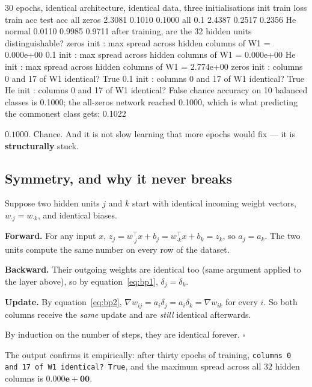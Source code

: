 \documentclass[11pt]{article}
\begin{document}
\begin{codeout}
30 epochs, identical architecture, identical data, three initialisations
  init            train loss  train acc  test acc
  all zeros         2.3081      0.1010     0.1000
  all 0.1           2.4387      0.2517     0.2356
  He normal         0.0110      0.9985     0.9711
after training, are the 32 hidden units distinguishable?
  zeros init : max spread across hidden columns of W1 = 0.000e+00
  0.1   init : max spread across hidden columns of W1 = 0.000e+00
  He    init : max spread across hidden columns of W1 = 2.774e+00
  zeros init : columns 0 and 17 of W1 identical? True
  0.1   init : columns 0 and 17 of W1 identical? True
  He    init : columns 0 and 17 of W1 identical? False
chance accuracy on 10 balanced classes is 0.1000;
  the all-zeros network reached 0.1000, which is what predicting the
  commonest class gets: 0.1022
\end{codeout}

$\mathbf{0.1000}$. Chance. And it is not slow learning that more epochs would
fix --- it is \textbf{structurally} stuck.

\subsection{Symmetry, and why it never breaks}

\begin{worked}
Suppose two hidden units $j$ and $k$ start with identical incoming weight
vectors, $w_{\cdot j} = w_{\cdot k}$, and identical biases.

\textbf{Forward.} For any input $x$, $z_j = w_{\cdot j}^\top x + b_j =
w_{\cdot k}^\top x + b_k = z_k$, so $a_j = a_k$. The two units compute the
same number on every row of the dataset.

\textbf{Backward.} Their outgoing weights are identical too (same argument
applied to the layer above), so by equation~\eqref{eq:bp1},
$\delta_j = \delta_k$.

\textbf{Update.} By equation~\eqref{eq:bp2}, $\nabla w_{ij} = a_i\delta_j =
a_i\delta_k = \nabla w_{ik}$ for every $i$. So both columns receive the
\emph{same} update and are \emph{still} identical afterwards.

By induction on the number of steps, they are identical forever.
\ensuremath{\square}
\end{worked}

The output confirms it empirically: after thirty epochs of training,
\texttt{columns 0 and 17 of W1 identical? True}, and the maximum spread across
all $32$ hidden columns is $\mathbf{0.000e+00}$.
\end{document}
